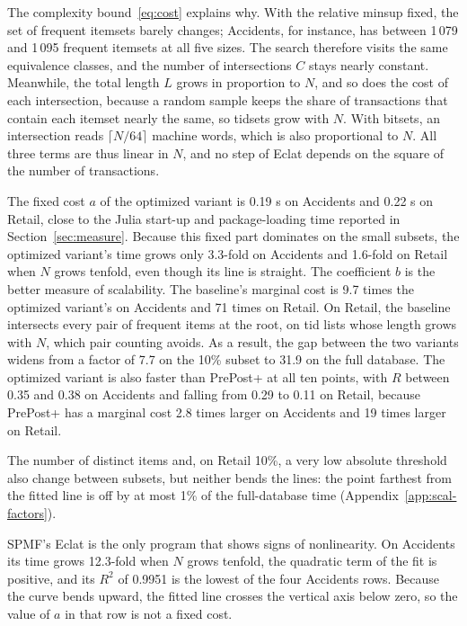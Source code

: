 The complexity bound~\eqref{eq:cost} explains why. With the relative minsup fixed, the
set of frequent itemsets barely changes; Accidents, for instance, has between 1\,079 and
1\,095 frequent itemsets at all five sizes. The search therefore visits the same
equivalence classes, and the number of intersections $C$ stays nearly constant.
Meanwhile, the total length $L$ grows in proportion to $N$, and so does the cost of each
intersection, because a random sample keeps the share of transactions that contain each
itemset nearly the same, so tidsets grow with $N$. With bitsets, an intersection reads
$\lceil N/64 \rceil$ machine words, which is also proportional to $N$. All three terms are
thus linear in $N$, and no step of Eclat depends on the square of the number of
transactions.

The fixed cost $a$ of the optimized variant is 0.19 s on Accidents and 0.22 s on Retail,
close to the Julia start-up and package-loading time reported in Section~\ref{sec:measure}.
Because this fixed part dominates on the small subsets, the optimized variant's time grows
only 3.3-fold on Accidents and 1.6-fold on Retail when $N$ grows tenfold, even though its
line is straight. The coefficient $b$ is the better measure of scalability. The baseline's
marginal cost is 9.7 times the optimized variant's on Accidents and 71 times on Retail. On
Retail, the baseline intersects every pair of frequent items at the root, on tid lists
whose length grows with $N$, which pair counting avoids. As a result, the gap between the two variants widens from a factor of 7.7 on the 10\% subset
to 31.9 on the full database. The optimized variant is also faster than PrePost+ at all
ten points, with $R$ between 0.35 and 0.38 on Accidents and falling from 0.29 to 0.11 on
Retail, because PrePost+ has a marginal cost 2.8 times larger on Accidents and 19 times
larger on Retail.

The number of distinct items and, on Retail 10\%, a very low absolute threshold also
change between subsets, but neither bends the lines: the point farthest from the fitted
line is off by at most 1\% of the full-database time (Appendix~\ref{app:scal-factors}).

SPMF's Eclat is the only program that shows signs of nonlinearity. On Accidents its time
grows 12.3-fold when $N$ grows tenfold, the quadratic term of the fit is positive, and its
$R^2$ of 0.9951 is the lowest of the four Accidents rows. Because the curve bends upward,
the fitted line crosses the vertical axis below zero, so the value of $a$ in that row is
not a fixed cost.

